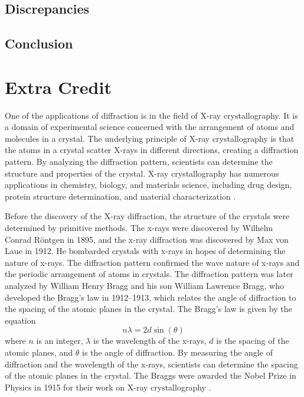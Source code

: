 \documentclass[10pt]{article}
\begin{document}
\subsection*{Discrepancies}

\subsection*{Conclusion} 

\section{Extra Credit}

One of the applications of diffraction is in the field of X-ray crystallography. It is a domain of experimental science concerned with the arrangement of atoms and molecules in a crystal. The underlying principle of X-ray crystallography is that the atoms in a crystal scatter X-rays in different directions, creating a diffraction pattern. By analyzing the diffraction pattern, scientists can determine the structure and properties of the crystal. X-ray crystallography has numerous applications in chemistry, biology, and materials science, including drug design, protein structure determination, and material characterization \cite{Carvalho_2009}.

Before the discovery of the X-ray diffraction, the structure of the crystals were determined by primitive methods. The x-rays were discovered by Wilhelm Conrad Röntgen in 1895, and the x-ray diffraction was discovered by Max von Laue in 1912. He bombarded crystals with x-rays in hopes of determining the nature of x-rays. The diffraction pattern confirmed the wave nature of x-rays and the periodic arrangement of atoms in crystals. The diffraction pattern was later analyzed by William Henry Bragg and his son William Lawrence Bragg, who developed the Bragg's law in 1912--1913, which relates the angle of diffraction to the spacing of the atomic planes in the crystal. The Bragg's law is given by the equation
\begin{equation}
  n \lambda = 2 d \sin(\theta)
\end{equation}
where $n$ is an integer, $\lambda$ is the wavelength of the x-rays, $d$ is the spacing of the atomic planes, and $\theta$ is the angle of diffraction. By measuring the angle of diffraction and the wavelength of the x-rays, scientists can determine the spacing of the atomic planes in the crystal. The Braggs were awarded the Nobel Prize in Physics in 1915 for their work on X-ray crystallography \cite{Bragg_1913}.
\end{document}
